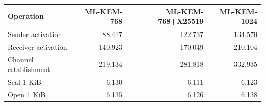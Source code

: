 \begin{tabular}{lrrr}
\toprule
Operation & ML-KEM-768 & ML-KEM-768+X25519 & ML-KEM-1024 \\
\midrule
Sender activation & 88.417 & 122.737 & 134.570 \\
Receiver activation & 140.923 & 170.049 & 210.104 \\
Channel establishment & 219.134 & 281.818 & 332.935 \\
Seal 1 KiB & 6.130 & 6.111 & 6.123 \\
Open 1 KiB & 6.135 & 6.126 & 6.138 \\
\bottomrule
\end{tabular}
